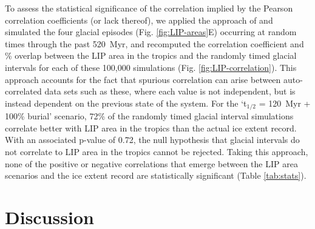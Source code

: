 To assess the statistical significance of the correlation implied by the Pearson correlation coefficients (or lack thereof), we applied the approach of \citet{Macdonald2019a} and simulated the four glacial episodes (Fig. \ref{fig:LIP-areas}E) occurring at random times through the past 520~Myr, and recomputed the correlation coefficient and \% overlap between the LIP area in the tropics and the randomly timed glacial intervals for each of these 100,000 simulations (Fig. \ref{fig:LIP-correlation}). This approach accounts for the fact that spurious correlation can arise between auto-correlated data sets such as these, where each value is not independent, but is instead dependent on the previous state of the system. For the `t$_{1/2}$ = 120~Myr + 100\% burial' scenario, 72\% of the randomly timed glacial interval simulations correlate better with LIP area in the tropics than the actual ice extent record. With an associated p-value of 0.72, the null hypothesis that glacial intervals do not correlate to LIP area in the tropics cannot be rejected. Taking this approach, none of the positive or negative correlations that emerge between the LIP area scenarios and the ice extent record are statistically significant (Table \ref{tab:stats}).

\section{Discussion}

